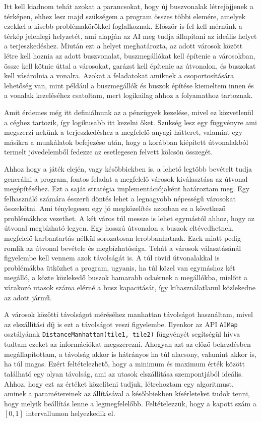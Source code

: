 Itt kell kiadnom tehát azokat a parancsokat, hogy új buszvonalak létrejöjjenek a térképen, ehhez lesz majd szükségem a program összes többi elemére, amelyek ezekkel a kisebb problémakörökkel foglalkoznak. Először is fel kell mérnünk a térkép jelenlegi helyzetét, ami alapján az AI meg tudja állapítani az ideális helyet a terjeszkedéshez. Miután ezt a helyet meghatározta, az adott városok között létre kell hoznia az adott buszvonalat, buszmegállókat kell építenie a városokban, össze kell kötnie úttal a városokat, garázst kell építenie az útvonalon, és buszokat kell vásárolnia a vonalra. Azokat a feladatokat amiknek a csoportosítására lehetőség van, mint például a buszmegállók és buszok építése kiemeltem innen és a vonalak kezeléséhez csatoltam, mert logikailag ahhoz a folyamathoz tartoznak.

Amit érdemes még itt definiálnunk az a pénzügyek kezelése, mivel ez közvetlenül a céghez tartozik, így logikusabb itt kezelni őket. Szükség lesz egy függvényre ami megszerzi nekünk a terjeszkedéshez a megfelelő anyagi hátteret, valamint egy másikra a munkálatok befejezése után, hogy a korábban kiépített útvonalakból termelt jövedelemből fedezze az esetlegesen felvett kölcsön összegét.


Ahhoz hogy a játék elején, vagy későbbiekben is, a lehető legtöbb bevételt tudja generálni a program, fontos feladat a megfelelő városok kiválasztása az útvonal megépítéséhez. Ezt a saját stratégia implementációjaként határoztam meg. Egy felhasználó számára ésszerű döntés lehet a legnagyobb népességű városokat összekötni. Ami ténylegesen egy jó megközelítés azonban ez a következő problémákhoz vezethet. A két város túl messze is lehet egymástól ahhoz, hogy az útvonal megbízható legyen. Egy hosszú útvonalon a buszok eltévedhetnek, megfelelő karbantartás nélkül sorozatosan lerobbanhatnak. Ezek miatt pedig romlik az útvonal bevétele és megbízhatósága. Tehát a városok választásánál figyelembe kell vennem azok távolságát is. A túl rövid útvonalakkal is problémákba ütközhet a program, ugyanis, ha túl közel van egymáshoz két megálló, a közte közlekedő buszok hamarabb odaérnek a megállókba, mielőtt a várakozó utasok száma elérné a busz kapacitását, így kihasználatlanul közlekedne az adott jármű.

A városok közötti távolságot méréséhez manhattan távolságot használtam, mivel az elszállítási díj is ezt a távolságot veszi figyelembe. Ilyenkor az API \texttt{AIMap} osztályának \texttt{DistanceManhattan(tile1, tile2)} függvényét segítségül hívva tudtam ezeket az információkat megszerezni. Ahogyan azt az előző bekezdésben megállapítottam, a távolság akkor is hátrányos ha túl alacsony, valamint akkor is, ha túl magas. Ezért feltételezhető, hogy a minimum és maximum érték között található egy olyan távolság, ami az utasok elszállítása szempontjából ideális. Ahhoz, hogy ezt az értéket közelíteni tudjuk, létrehoztam egy algoritmust, aminek a paramétereinek az állításával a későbbiekben kísérleteket tudok tenni, hogy melyik beállítás lenne a legmegfelelőbb. Feltételezzük, hogy a kapott szám a $[0, 1]$ intervallumon helyezkedik el.

